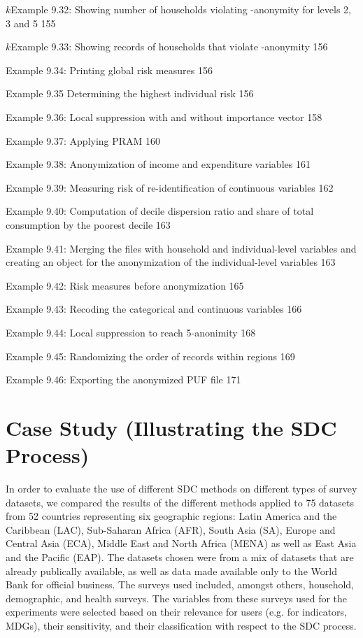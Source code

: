\documentclass[letterpaper,10pt,english]{sphinxmanual}
\begin{document}
\(k\)Example 9.32: Showing number of households violating
-anonymity for levels 2, 3 and 5 155

\(k\)Example 9.33: Showing records of households that violate
-anonymity 156

Example 9.34: Printing global risk measures 156

Example 9.35 Determining the highest individual risk 156

Example 9.36: Local suppression with and without importance vector 158

Example 9.37: Applying PRAM 160

Example 9.38: Anonymization of income and expenditure variables 161

Example 9.39: Measuring risk of re-identification of continuous
variables 162

Example 9.40: Computation of decile dispersion ratio and share of total
consumption by the poorest decile 163

Example 9.41: Merging the files with household and individual-level
variables and creating an  object for the anonymization of the
individual-level variables 163

Example 9.42: Risk measures before anonymization 165

Example 9.43: Recoding the categorical and continuous variables 166

Example 9.44: Local suppression to reach 5-anonimity 168

Example 9.45: Randomizing the order of records within regions 169

Example 9.46: Exporting the anonymized PUF file 171


\chapter{Case Study (Illustrating the SDC Process)}
\label{\detokenize{case_studies::doc}}\label{\detokenize{case_studies:case-study-illustrating-the-sdc-process}}
In order to evaluate the use of different SDC methods on different types
of survey datasets, we compared the results of the different methods
applied to 75 datasets from 52 countries representing six geographic
regions: Latin America and the Caribbean (LAC), Sub-Saharan Africa
(AFR), South Asia (SA), Europe and Central Asia (ECA), Middle East and
North Africa (MENA) as well as East Asia and the Pacific (EAP). The
datasets chosen were from a mix of datasets that are already publically
available, as well as data made available only to the World Bank for
official business. The surveys used included, amongst others, household,
demographic, and health surveys. The variables from these surveys used
for the experiments were selected based on their relevance for users
(e.g. for indicators, MDGs), their sensitivity, and their classification
with respect to the SDC process.
\end{document}
